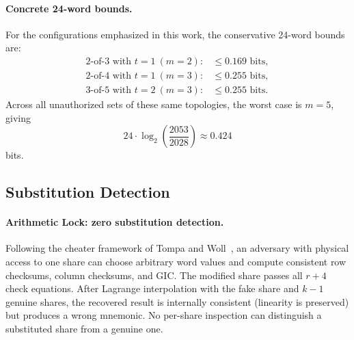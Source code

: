 \documentclass[11pt]{article}
\begin{document}
\paragraph{Concrete 24-word bounds.} For the configurations emphasized in this work, the conservative 24-word bounds are:
\[
\begin{array}{ll}
\text{2-of-3 with } t=1 \ (m=2): & \le 0.169 \text{ bits},\\
\text{2-of-4 with } t=1 \ (m=3): & \le 0.255 \text{ bits},\\
\text{3-of-5 with } t=2 \ (m=3): & \le 0.255 \text{ bits}.
\end{array}
\]
Across all unauthorized sets of these same topologies, the worst case is $m=5$, giving
\[
    24 \cdot \log_2\!\left(\frac{2053}{2028}\right) \approx 0.424
\]
bits.

\subsection{Substitution Detection}
\label{sec:substitution}

\paragraph{Arithmetic Lock: zero substitution detection.} Following the cheater framework of Tompa and Woll~\cite{tompa1988}, an adversary with physical access to one share can choose arbitrary word values and compute consistent row checksums, column checksums, and GIC. The modified share passes all $r + 4$ check equations. After Lagrange interpolation with the fake share and $k{-}1$ genuine shares, the recovered result is internally consistent (linearity is preserved) but produces a wrong mnemonic. No per-share inspection can distinguish a substituted share from a genuine one.
\end{document}
